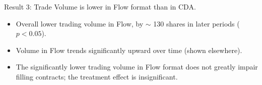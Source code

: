 \documentclass[10pt]{beamer}
\begin{document}
\begin{frame}{Result 3: Trade Volume is lower in Flow format than in CDA.}
\begin{itemize}
\item Overall lower trading volume in Flow, by $\sim$ 130 shares in later periods ($p < 0.05$).
\item Volume in Flow trends significantly upward over time (shown elsewhere).
\item The significantly lower trading volume in Flow format does not greatly impair filling contracts; the treatment effect is insignificant.
\end{itemize}   
\end{frame}





\end{document}
